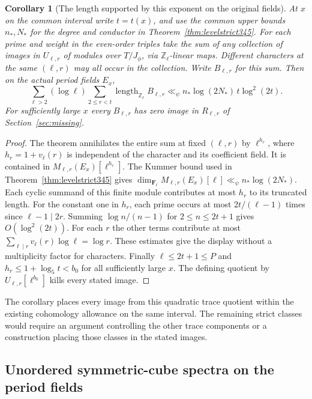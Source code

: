 \documentclass[a4paper,11pt]{article}
\newtheorem{corollary}[proposition]{Corollary}
\theoremstyle{definition}
\theoremstyle{remark}
\newcommand{\ZZ}{\mathbb Z}\newcommand{\ord}{\operatorname{ord}}
\numberwithin{equation}{section}
\begin{document}
\begin{corollary}[The length supported by this exponent on the original fields]
\leavevmode\label{cor:quadraticcutoff587}
At \(x\) on the common interval write \(t=t(x)\), and use
the common upper bounds \(n_*,N_*\) for the degree and
conductor in Theorem~\ref{thm:levelstrict345}. For each prime
and weight in the even-order triples take the sum of any
collection of images in \(U_{\ell,r}\) of modules over
\(T/J_\phi\), via \(\ZZ_\ell\)-linear maps. Different
characters at the same \((\ell,r)\) may all occur in the
collection. Write \(B_{\ell,r}\) for this sum. Then on
the actual period fields \(E_x\),
\[
 \sum_{\ell>2}(\log\ell)\sum_{2\le r<t}
         \operatorname{length}_{\ZZ_\ell} B_{\ell,r}
       \ll_\psi n_* \log(2N_*)\,t\log^2(2t).
\]
For sufficiently large \(x\) every \(B_{\ell,r}\) has zero
image in \(R_{\ell,r}\) of Section~\ref{sec:missing}.
\end{corollary}
\begin{proof}
The theorem annihilates the entire sum at fixed \((\ell,r)\)
by \(\ell^{h_r}\), where \(h_r=1+v_\ell(r)\) is independent
of the character and its coefficient field. It is contained
in \(M_{\ell,r}(E_x)[\ell^{h_r}]\). The Kummer bound used in
Theorem~\ref{thm:levelstrict345} gives
\(\dim_{\mathbf F_\ell}M_{\ell,r}(E_x)[\ell]\ll_\psi
n_*\log(2N_*)\). Each cyclic summand of this finite module
contributes at most \(h_r\) to its truncated length.
For the constant one in \(h_r\), each prime occurs at most
\(2t/(\ell-1)\) times since \(\ell-1\mid2r\).
Summing \(\log n/(n-1)\) for \(2\le n\le2t+1\) gives
\(O(\log^2(2t))\). For each \(r\) the other terms contribute
at most \(\sum_{\ell\mid r}v_\ell(r)\log\ell=\log r\).
These estimates give the display without a multiplicity
factor for characters. Finally \(\ell\le2t+1\le P\) and
\(h_r\le1+\log_5 t<b_0\) for all sufficiently large \(x\).
The defining quotient by \(U_{\ell,r}[\ell^{b_0}]\) kills
every stated image.
\end{proof}

The corollary places every image from this quadratic trace
quotient within the existing cohomology allowance on the
same interval. The remaining strict classes would require
an argument controlling the other trace components or a
construction placing those classes in the stated images.


\subsection{Unordered symmetric-cube spectra on the period fields}
\label{sec:unorderedcube588}
\end{document}
